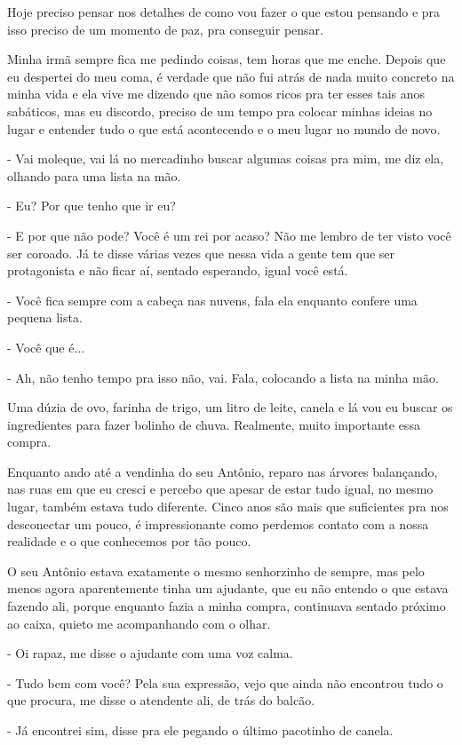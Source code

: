 Hoje preciso pensar nos detalhes de como vou fazer o que estou pensando e pra isso preciso de um momento de paz, pra conseguir pensar.

Minha irmã sempre fica me pedindo coisas, tem horas que me enche. Depois que eu despertei do meu coma, é verdade que não fui atrás de nada muito concreto na minha vida e ela vive me dizendo que não somos ricos pra ter esses tais anos sabáticos, mas eu discordo, preciso de um tempo pra colocar minhas ideias no lugar e entender tudo o que está acontecendo e o meu lugar no mundo de novo.

- Vai moleque, vai lá no mercadinho buscar algumas coisas pra mim, me diz ela, olhando para uma lista na mão.

- Eu? Por que tenho que ir eu?

- E por que não pode? Você é um rei por acaso? Não me lembro de ter visto você ser coroado. Já te disse várias vezes que nessa vida a gente tem que ser protagonista e não ficar aí, sentado esperando, igual você está.

- Você fica sempre com a cabeça nas nuvens, fala ela enquanto confere uma pequena lista.

- Você que é...

- Ah, não tenho tempo pra isso não, vai. Fala, colocando a lista na minha mão.

Uma dúzia de ovo, farinha de trigo, um litro de leite, canela e lá vou eu buscar os ingredientes para fazer bolinho de chuva. Realmente, muito importante essa compra.

Enquanto ando até a vendinha do seu Antônio, reparo nas árvores balançando, nas ruas em que eu cresci e percebo que apesar de estar tudo igual, no mesmo lugar, também estava tudo diferente. Cinco anos são mais que suficientes pra nos desconectar um pouco, é impressionante como perdemos contato com a nossa realidade e o que conhecemos por tão pouco.

O seu Antônio estava exatamente o mesmo senhorzinho de sempre, mas pelo menos agora aparentemente tinha um ajudante, que eu não entendo o que estava fazendo ali, porque enquanto fazia a minha compra, continuava sentado próximo ao caixa, quieto me acompanhando com o olhar.

- Oi rapaz, me disse o ajudante com uma voz calma. 

- Tudo bem com você? Pela sua expressão, vejo que ainda não encontrou tudo o que procura, me disse o atendente ali, de trás do balcão.

- Já encontrei sim, disse pra ele pegando o último pacotinho de canela.

